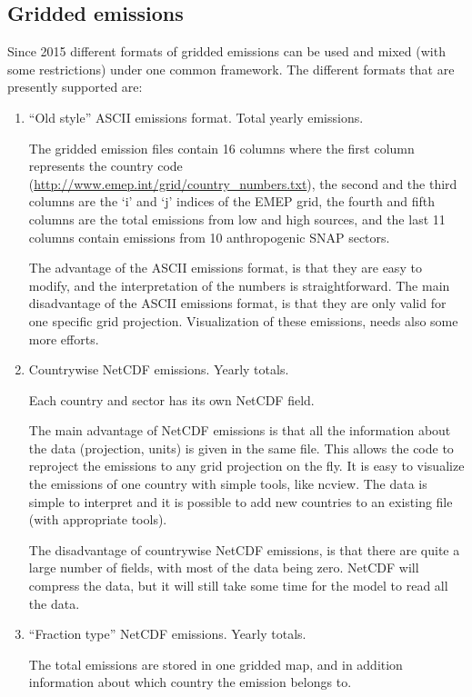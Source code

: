 \subsection{Gridded emissions}
\label{emisnew}

Since 2015 different formats of gridded emissions can be used and
mixed (with some restrictions) under one common framework. The
different formats that are presently supported are: 
\begin{enumerate}
\item ``Old style'' ASCII emissions format. Total yearly emissions.

The gridded emission files contain 16 columns where the first column 
represents the country code
(\url{http://www.emep.int/grid/country_numbers.txt}), 
the second and the third columns are the `i' and `j' indices of the
EMEP grid, the fourth and fifth columns are the total emissions from
low and high sources, and the last 11 columns contain emissions from 
10 anthropogenic SNAP sectors.

The advantage of the ASCII emissions format, is that they are easy to
modify, and the interpretation of the numbers is straightforward. 
The main disadvantage of the ASCII emissions format, is that they are
only valid for one specific grid projection. Visualization of these
emissions, needs also some more efforts. 

\item Countrywise NetCDF emissions. Yearly totals.

Each country and sector has its own NetCDF field.

The main advantage of NetCDF emissions is that all the information
about the data (projection, units) is given in the same file. This
allows the code to reproject the emissions to any grid projection on
the fly. It is easy to visualize the emissions of one country with
simple tools, like ncview. The data is simple to interpret and it is
possible to add new countries to an existing file (with appropriate
tools). 

The disadvantage of countrywise NetCDF emissions, is that there are
quite a large number of fields, with most of the data being
zero. NetCDF will compress the data, but it will still take some time
for the model to read all the data. 
 
\item ``Fraction type'' NetCDF emissions. Yearly totals.

The total emissions are stored in one gridded map, and in addition
information about which country the emission belongs to. 


\end{enumerate}
